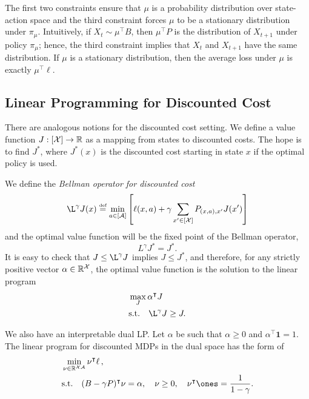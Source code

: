 \documentclass[11pt]{article}
\newcommand{\df}{\stackrel{\mbox{\rm\tiny def}}{=}}
\begin{document}
The first two constraints ensure that $\mu$ is a probability distribution over state-action space and the third constraint forces $\mu$ to be a stationary distribution under $\pi_{\mu}$. Intuitively, if $X_t\sim \mu^\top B$, then $\mu^\top P$ is the distribution of $X_{t+1}$ under policy $\pi_{\mu}$; hence, the third constraint implies that $X_t$ and $X_{t+1}$ have the same distribution. If $\mu$ is a stationary distribution, then the average loss under $\mu$ is exactly $\mu^\top \ell$.


\subsection{Linear Programming for Discounted Cost}
There are analogous notions for the discounted cost setting. We define a value function $J:  [{\cal X}]\rightarrow \mathbb R$ as a mapping from states to discounted costs. The hope is to find $J^*$, where $J^*(x)$ is the discounted cost starting in state $x$ if the optimal policy is used.

We define the \emph{Bellman operator for discounted cost}
\begin{equation*}
\L^\gamma J(x)\df
\min_{a \in [\cA]} \left[ \ell(x,a) + \gamma \sum_{x'\in[\cX]} P_{(x,a),x'} J(x') \right]
\end{equation*}
and the optimal value function will be the fixed point of the Bellman operator,
\begin{equation*}
  L^\gamma J^* = J^*.
\end{equation*}
It is easy to check that $J\leq \L^\gamma J$ implies $J\leq J^*$, and therefore, for any strictly positive vector $\alpha \in\mathbb R^{\cal X}$, the optimal value function is the solution to the linear program
\begin{align}
\label{LP:exact_discounted}
&\max_{J} \alpha^\top J\\
\notag
&\mbox{s.t.}\quad \L^\gamma J\geq J.
\end{align}

We also have an interpretable dual LP. Let $\alpha$ be such that $\alpha\ge 0$ and $\alpha^\top \mathbf{1} = 1$. The linear program for discounted MDPs in the dual space has the form of
\begin{align}
\label{LP:exact_discounted_dual}
&\min_{\nu\in\Reals^{\cX \cA}} \nu^\top \ell\,, \\
\notag
&\mbox{s.t.} \quad (B - \gamma P)^\top \nu  = \alpha,\quad \nu\geq 0, \quad \nu^\top \ones = \frac{1}{1-\gamma}.
\end{align}
\end{document}
